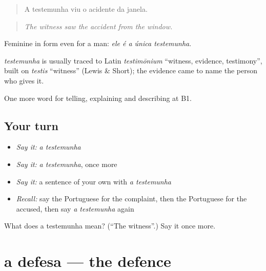 \begin{quote}
A testemunha viu o acidente da janela.
\end{quote}

\begin{quote}
\emph{The witness saw the accident from the window.}
\end{quote}

Feminine in form even for a man: \emph{ele é a única testemunha}.

\begin{cousinweb}
\emph{testemunha} is usually traced to Latin \emph{testimōnium} \textquotedblleft{}witness, evidence, testimony\textquotedblright{}, built on \emph{testis} \textquotedblleft{}witness\textquotedblright{} (Lewis \& Short); the evidence came to name the person who gives it.
\end{cousinweb}

\begin{grammarlens}[title={What you've built}]
One more word for telling, explaining and describing at B1.
\end{grammarlens}

\subsection*{Your turn}
\begin{itemize}
\raggedright
  \item \emph{Say it:} \emph{a testemunha}
  \item \emph{Say it:} \emph{a testemunha}, once more
  \item \emph{Say it:} a sentence of your own with \emph{a testemunha}
  \item \emph{Recall:} say the Portuguese for the complaint, then the Portuguese for the accused, then say \emph{a testemunha} again
\end{itemize}

\begin{tcolorbox}[breakable,colback=teal!4,colframe=teal!35!black,title={Before you move on}]
What does a testemunha mean? (\textquotedblleft{}The witness\textquotedblright{}.) Say it once more.
\end{tcolorbox}
\section[a defesa]{a defesa — the defence}

\label{lesson:PT-C387-defesa}



